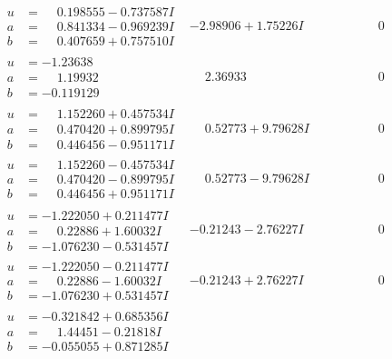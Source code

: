 \documentclass[1p]{elsarticle_modified}
\theoremstyle{definition}
\begin{document}
$$\begin{array}{c|c|c}
\begin{aligned}
u &= \phantom{-}0.198555 - 0.737587 I \\
a &= \phantom{-}0.841334 - 0.969239 I \\
b &= \phantom{-}0.407659 + 0.757510 I\end{aligned}
 & -2.98906 + 1.75226 I & \phantom{-0.000000 } 0 \\ \hline\begin{aligned}
u &= -1.23638\phantom{ +0.000000I} \\
a &= \phantom{-}1.19932\phantom{ +0.000000I} \\
b &= -0.119129\phantom{ +0.000000I}\end{aligned}
 & \phantom{-}2.36933\phantom{ +0.000000I} & \phantom{-0.000000 } 0 \\ \hline\begin{aligned}
u &= \phantom{-}1.152260 + 0.457534 I \\
a &= \phantom{-}0.470420 + 0.899795 I \\
b &= \phantom{-}0.446456 - 0.951171 I\end{aligned}
 & \phantom{-}0.52773 + 9.79628 I & \phantom{-0.000000 } 0 \\ \hline\begin{aligned}
u &= \phantom{-}1.152260 - 0.457534 I \\
a &= \phantom{-}0.470420 - 0.899795 I \\
b &= \phantom{-}0.446456 + 0.951171 I\end{aligned}
 & \phantom{-}0.52773 - 9.79628 I & \phantom{-0.000000 } 0 \\ \hline\begin{aligned}
u &= -1.222050 + 0.211477 I \\
a &= \phantom{-}0.22886 + 1.60032 I \\
b &= -1.076230 - 0.531457 I\end{aligned}
 & -0.21243 - 2.76227 I & \phantom{-0.000000 } 0 \\ \hline\begin{aligned}
u &= -1.222050 - 0.211477 I \\
a &= \phantom{-}0.22886 - 1.60032 I \\
b &= -1.076230 + 0.531457 I\end{aligned}
 & -0.21243 + 2.76227 I & \phantom{-0.000000 } 0 \\ \hline\begin{aligned}
u &= -0.321842 + 0.685356 I \\
a &= \phantom{-}1.44451 - 0.21818 I \\
b &= -0.055055 + 0.871285 I\end{aligned}

\end{array}$$
\end{document}
